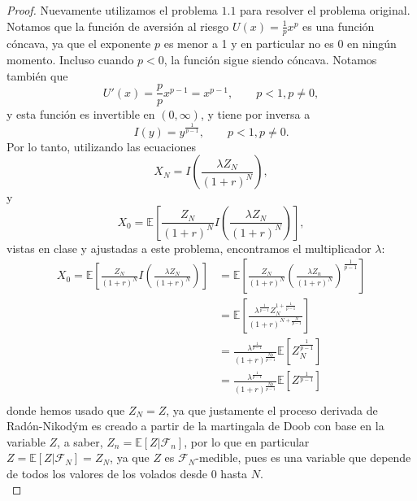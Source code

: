 \documentclass[letterpaper]{article}
\newcommand{\F}{\mathcal{F}}
\newcommand{\E}{\mathbb{E}}
\newcommand{\1}{\mathds{1}}
\theoremstyle{definition}
\theoremstyle{definition}
\theoremstyle{definition}
\theoremstyle{definition}
\theoremstyle{definition}
\begin{document}
\begin{enumerate}
\begin{proof}
      Nuevamente utilizamos el problema $1.1$ para resolver el problema original.
      Notamos que la función de aversión al riesgo $U(x)=\frac{1}{p}x^{p}$ es una función cóncava, ya que
      el exponente $p$ es menor a 1 y en particular no es 0 en ningún momento. Incluso cuando $p<0$, la función
      sigue siendo cóncava. Notamos también que 
      \[
      U'(x)=\frac{p}{p}x^{p-1}=x^{p-1}, \qquad p<1, p\neq 0,    
      \]
      y esta función es invertible en $(0,\infty)$, y tiene por inversa a 
      \[
      I(y)=y^{\frac{1}{p-1}}, \qquad p<1, p\neq 0.
      \]
      Por lo tanto, utilizando las ecuaciones
      \[
        X_N=I \left(\frac{\lambda Z_N}{(1+r)^N}\right),
        \]
        y
        \[
        X_0=\E\left[\frac{Z_N}{(1+r)^N}I \left(\frac{\lambda Z_N}{(1+r)^N}\right)\right],
        \]
        vistas en clase y ajustadas a este problema, encontramos el multiplicador $\lambda$:
        \begin{align*}
            X_0=\E\left[\frac{Z_N}{(1+r)^N}I \left(\frac{\lambda Z_N}{(1+r)^N}\right)\right]&=\E\left[\frac{Z_N}{(1+r)^N}\left(\frac{\lambda Z_n}{(1+r)^N}\right)^{\frac{1}{p-1}}\right]\\
            &=\E\left[\frac{\lambda^{\frac{1}{p-1}}Z_N^{1+\frac{1}{p-1}}}{(1+r)^{N+\frac{N}{p-1}}}\right]\\
            &=\frac{\lambda^{\frac{1}{p-1}}}{(1+r)^{\frac{Np}{p-1}}}\E\left[Z_N^{\frac{1}{p-1}}\right]\\
            &=\frac{\lambda^{\frac{1}{p-1}}}{(1+r)^{\frac{Np}{p-1}}}\E\left[Z^{\frac{1}{p-1}}\right]\\
        \end{align*}
        donde hemos usado que $Z_N=Z$, ya que justamente el proceso derivada de Radón-Nikodým es creado
        a partir de la martingala de Doob con base en la variable $Z$, a saber, $Z_n=\E\left[Z|\F_n\right]$, por lo 
        que en particular $Z=\E\left[Z|\F_N\right]=Z_N$, ya que $Z$ es $\F_N$-medible, pues es una variable
        que depende de todos los valores de los volados desde $0$ hasta $N$.\\


\end{proof}
\end{enumerate}
\end{document}
